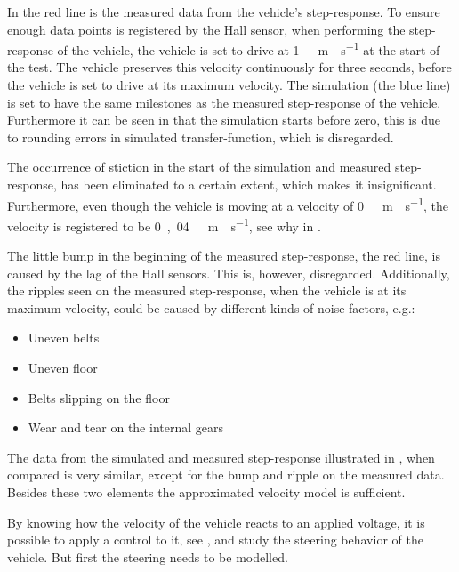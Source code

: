 %
In  the red line is the measured data from the vehicle's step-response. To ensure enough data points is registered by the Hall sensor, when performing the step-response of the vehicle, the vehicle is set to drive at \si{1\ m\cdot s^{-1}} at the start of the test. The vehicle preserves this velocity continuously for three seconds, before the vehicle is set to drive at its maximum velocity. The simulation (the blue line) is set to have the same milestones as the measured step-response of the vehicle. Furthermore it can be seen in  that the simulation starts before zero, this is due to rounding errors in simulated transfer-function, which is disregarded.

The occurrence of stiction in the start of the simulation and measured step-response, has been eliminated to a certain extent, which makes it insignificant. Furthermore, even though the vehicle is moving at a velocity of \si{0\ m \cdot s^{-1}}, the velocity is registered to be \si{0,04\ m \cdot s^{-1}}, see why in . 

The little bump in the beginning of the measured step-response, the red line, is caused by the lag of the Hall sensors. This is, however, disregarded. Additionally, the ripples seen on the measured step-response, when the vehicle is at its maximum velocity, could be caused by different kinds of noise factors, e.g.:

\begin{itemize}
\item Uneven belts
\item Uneven floor
\item Belts slipping on the floor
\item Wear and tear on the internal gears
\end{itemize}

The data from the simulated and measured step-response illustrated in , when compared is very similar, except for the bump and ripple on the measured data. Besides these two elements the approximated velocity model is sufficient.

By knowing how the velocity of the vehicle reacts to an applied voltage, it is possible to apply a control to it, see , and study the steering behavior of the vehicle. But first the steering needs to be modelled.